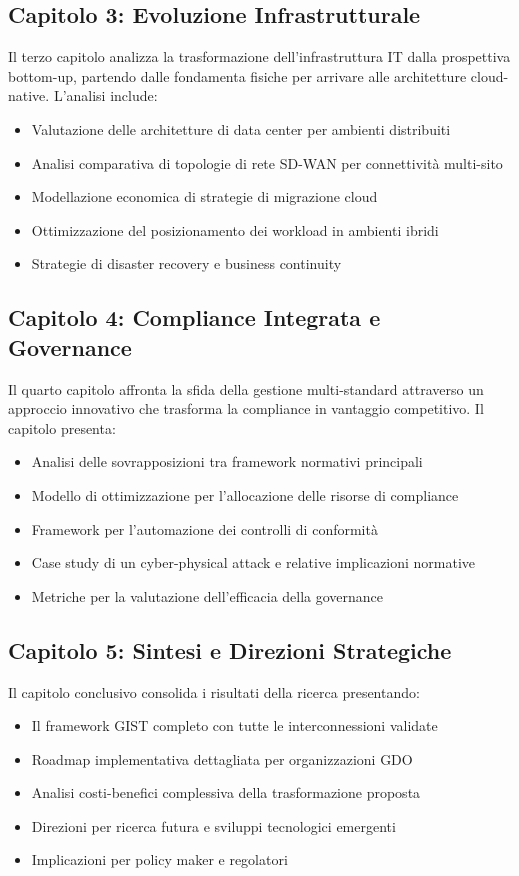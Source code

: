 \begin{bibunit}[IEEEtran]
\subsection{Capitolo 3: Evoluzione Infrastrutturale}

Il terzo capitolo analizza la trasformazione dell'infrastruttura IT dalla prospettiva bottom-up, partendo dalle fondamenta fisiche per arrivare alle architetture cloud-native. L'analisi include:
\begin{itemize}
\item Valutazione delle architetture di data center per ambienti distribuiti
\item Analisi comparativa di topologie di rete SD-WAN per connettività multi-sito
\item Modellazione economica di strategie di migrazione cloud
\item Ottimizzazione del posizionamento dei workload in ambienti ibridi
\item Strategie di disaster recovery e business continuity
\end{itemize}

\subsection{Capitolo 4: Compliance Integrata e Governance}

Il quarto capitolo affronta la sfida della gestione multi-standard attraverso un approccio innovativo che trasforma la compliance in vantaggio competitivo. Il capitolo presenta:
\begin{itemize}
\item Analisi delle sovrapposizioni tra framework normativi principali
\item Modello di ottimizzazione per l'allocazione delle risorse di compliance
\item Framework per l'automazione dei controlli di conformità
\item Case study di un cyber-physical attack e relative implicazioni normative
\item Metriche per la valutazione dell'efficacia della governance
\end{itemize}

\subsection{Capitolo 5: Sintesi e Direzioni Strategiche}

Il capitolo conclusivo consolida i risultati della ricerca presentando:
\begin{itemize}
\item Il framework GIST completo con tutte le interconnessioni validate
\item Roadmap implementativa dettagliata per organizzazioni GDO
\item Analisi costi-benefici complessiva della trasformazione proposta
\item Direzioni per ricerca futura e sviluppi tecnologici emergenti
\item Implicazioni per policy maker e regolatori
\end{itemize}


\end{bibunit}
